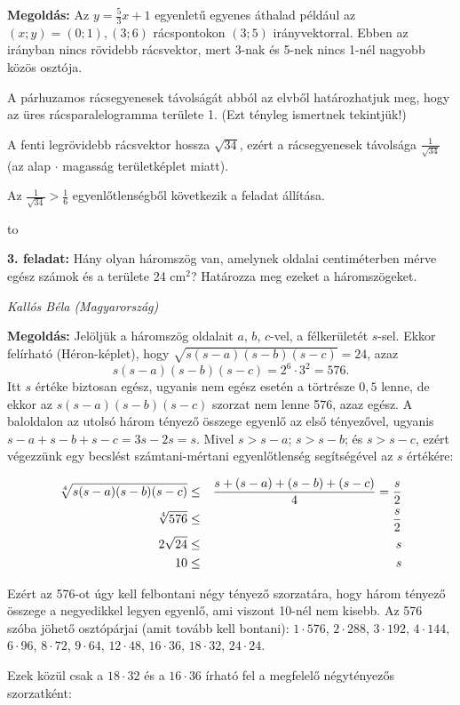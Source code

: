 \documentclass[a4paper,10pt]{article}
\newcommand{\ki}[2]{\hfill {\it #1 (#2)}\medskip}
\newcommand{\vonal}{\hbox to \hsize{\hskip2truecm\hrulefill\hskip2truecm}}
\begin{document}
{\bf Megoldás: } Az $y=\frac{5}{3}x+1$
egyenletű egyenes áthalad például az $(x; y) = (0; 1), (3; 6)$ rácspontokon
$(3; 5)$ irányvektorral. Ebben az irányban nincs rövidebb rácsvektor, mert 3-nak és 5-nek
nincs 1-nél nagyobb közös osztója. 

A párhuzamos rácsegyenesek távolságát abból az elvből határozhatjuk meg, hogy az üres
rácsparalelogramma területe 1. (Ezt tényleg ismertnek tekintjük!)

A fenti legrövidebb rácsvektor hossza $\sqrt{34}$, ezért a rácsegyenesek távolsága $\frac{1}{\sqrt{34}}$
(az alap $\cdot$ magasság területképlet miatt). 

Az
$\frac{1}{\sqrt{34}}>\frac{1}{6}$
egyenlőtlenségből következik a feladat állítása.

\medskip

\vonal

\newpage

{\bf 3. feladat: } Hány olyan háromszög van, amelynek oldalai centiméterben mérve egész számok és a
területe 24 cm$^2$? Határozza meg ezeket a háromszögeket.


\ki{Kallós Béla}{Magyarország}\medskip

{\bf Megoldás: } Jelöljük a háromszög oldalait 
$a$, $b$, $c$-vel, a félkerületét $s$-sel.
Ekkor felírható (Héron-képlet), hogy 
$\sqrt{s(s-a)(s-b)(s-c)}=24$, azaz
$$s(s-a)(s-b)(s-c)=2^6\cdot 3^2=576.$$
Itt $s$ értéke biztosan egész, ugyanis nem egész esetén a törtrésze $0{,}5$ lenne, de ekkor az
$s(s-a)(s-b)(s-c)$ szorzat nem lenne 576, azaz egész.
A baloldalon az utolsó három tényező összege egyenlő az első tényezővel, ugyanis $s-a+s-b+s-c=3s-2s=s$.
Mivel $s > s - a$; $s > s - b$; és $s > s-c$,
ezért végezzünk egy becslést számtani-mértani egyenlőtlenség segítségével az $s$ értékére:

\begin{eqnarray*}
\sqrt[4]{s(s-a)(s-b)(s-c)} &\le & \frac{s+(s-a)+(s-b)+(s-c)}{4}=\frac{s}{2}\cr
\sqrt[4]{576} &\le & \frac{s}{2}\cr
2\sqrt{24} &\le & s\cr
10 &\le & s
\end{eqnarray*}

Ezért az 576-ot úgy kell felbontani négy tényező szorzatára, hogy három tényező összege a
negyedikkel legyen egyenlő, ami viszont 10-nél nem kisebb. Az 576 szóba jöhető
osztópárjai (amit tovább kell bontani): $1\cdot 576$, $2\cdot 288$, $3\cdot 192$, $4\cdot 144$, $6\cdot 96$, $8\cdot 72$, $9\cdot 64$,
$12\cdot 48$, $16\cdot 36$, $18\cdot 32$, $24\cdot 24$.

Ezek közül csak a $18\cdot 32$ és a $16\cdot 36$ írható fel a megfelelő négytényezős szorzatként:
\end{document}
